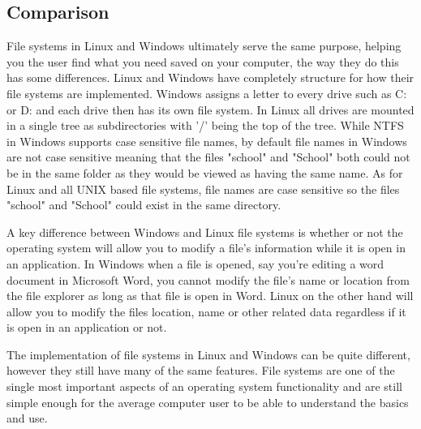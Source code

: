 \documentclass[10pt,serif,draftclsnofoot,onecolumn]{IEEEtran}
\begin{document}
	\subsection{Comparison}
	\par
			File systems in Linux and Windows ultimately serve the same purpose, helping you the user find what you need saved on your computer, the way they do this has some differences. Linux and Windows have completely structure for how their file systems are implemented. Windows assigns a letter to every drive such as C: or D: and each drive then has its own file system\cite{19}. In Linux all drives are mounted in a single tree as subdirectories with '/' being the top of the tree. While NTFS in Windows supports case sensitive file names, by default  file names in Windows are not case sensitive meaning that the files "school" and "School" both could not be in the same folder as they would be viewed as having the same name. As for Linux and all UNIX based file systems, file names are case sensitive so the files "school" and "School" could exist in the same directory.
	\newline
	\par
			A key difference between Windows and Linux file systems is whether or not the operating system will allow you to modify a file's information while it is open in an application. In Windows when a file is opened, say you're editing a word document in Microsoft Word, you cannot modify the file's name or location from the file explorer as long as that file is open in Word. Linux on the other hand will allow you to modify the files location, name or other related data regardless if it is open in an application or not.
	\newline
	\par
			The implementation of file systems in Linux and Windows can be quite different, however they still have many of the same features. File systems are one of the single most important aspects of an operating system functionality and are still simple enough for the average computer user to be able to understand the basics and use.
	\newpage


	
	
\end{document}
